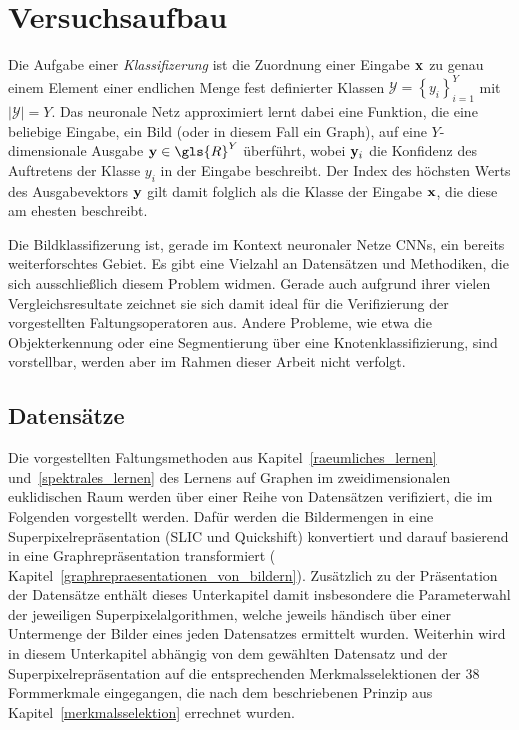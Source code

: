 \section{Versuchsaufbau}
\label{versuchsaufbau}

Die Aufgabe einer \emph{Klassifizerung} ist die Zuordnung einer Eingabe $\mathbf{x}$ zu genau einem Element einer endlichen Menge fest definierter Klassen $\mathcal{Y} = {\left\{y_i\right\}}_{i=1}^Y$ mit $\left|\mathcal{Y}\right| = Y$.
Das neuronale Netz approximiert \bzw{} lernt dabei eine Funktion, die eine beliebige Eingabe, \dhe{} ein Bild (oder in diesem Fall ein Graph), auf eine $Y$-dimensionale Ausgabe $\ve{y} \in \gls{R}^Y$ überführt, wobei $\mathbf{y}_i$ die Konfidenz des Auftretens der Klasse $y_i$ in der Eingabe beschreibt.
Der Index des höchsten Werts des Ausgabevektors $\mathbf{y}$ gilt damit folglich als die Klasse der Eingabe $\mathbf{x}$, die diese am ehesten beschreibt.

Die Bildklassifizerung ist, gerade im Kontext neuronaler Netze \bzw{} \glspl{CNN}, ein bereits weiterforschtes Gebiet.
Es gibt eine Vielzahl an Datensätzen und Methodiken, die sich ausschließlich diesem Problem widmen.
Gerade auch aufgrund ihrer vielen Vergleichsresultate zeichnet sie sich damit ideal für die Verifizierung der vorgestellten Faltungsoperatoren aus.
Andere Probleme, wie etwa die Objekterkennung oder eine Segmentierung über eine Knotenklassifizierung, sind vorstellbar, werden aber im Rahmen dieser Arbeit nicht verfolgt.

\subsection{Datensätze}
\label{datensaetze}

Die vorgestellten Faltungsmethoden aus Kapitel~\ref{raeumliches_lernen} und~\ref{spektrales_lernen} \bzgl{} des Lernens auf Graphen im zweidimensionalen euklidischen Raum werden über einer Reihe von Datensätzen verifiziert, die im Folgenden vorgestellt werden.
Dafür werden die Bildermengen in eine Superpixelrepräsentation (\gls{SLIC} und Quickshift) konvertiert und darauf basierend in eine Graphrepräsentation transformiert (\vgl{} Kapitel~\ref{graphrepraesentationen_von_bildern}).
Zusätzlich zu der Präsentation der Datensätze enthält dieses Unterkapitel damit insbesondere die Parameterwahl der jeweiligen Superpixelalgorithmen, welche jeweils händisch über einer Untermenge der Bilder eines jeden Datensatzes ermittelt wurden.
Weiterhin wird in diesem Unterkapitel abhängig von dem gewählten Datensatz und der Superpixelrepräsentation auf die entsprechenden Merkmalsselektionen der $38$ Formmerkmale eingegangen, die nach dem beschriebenen Prinzip aus Kapitel~\ref{merkmalsselektion} errechnet wurden.

